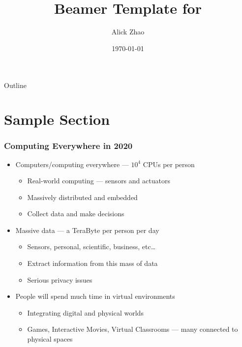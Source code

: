 \documentclass[onlycurpagenum,infolines]{beamer}
\title{Beamer Template for \tamu}
\author{Alick Zhao}
\institute[TAMU] %
{
\tamu
}
\date %
{\today}
\begin{document}
\begin{frame}[plain]
\titlepage
\end{frame}

\begin{frame}{Outline}
\tableofcontents
\end{frame}




\section{Sample Section}

\begin{frame}
  \frametitle{Computing Everywhere in 2020}
  \begin{itemize}
    \item Computers/computing everywhere --- $10^4$ CPUs per person
      \begin{itemize}
        \item Real-world computing --- sensors and actuators
        \item Massively distributed and embedded
        \item Collect data and make decisions
      \end{itemize}
    \item Massive data --- a TeraByte per person per day
      \begin{itemize}
        \item Sensors, personal, scientific, business, etc\ldots
        \item Extract information from this mass of data
        \item Serious privacy issues
      \end{itemize}
    \item People will spend much time in virtual environments
      \begin{itemize}
        \item Integrating digital and physical worlds
        \item Games, Interactive Movies, Virtual Classrooms --- many connected
        to physical spaces
      \end{itemize}
  \end{itemize}
\end{frame}
\end{document}
